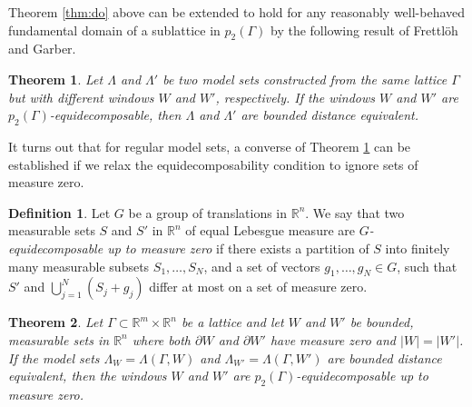 \documentclass[12pt,a4paper,oneside]{amsart}
\theoremstyle{plain}
\newtheorem{theorem}{Theorem}
\theoremstyle{definition}
\newtheorem{definition}{Definition}
\newtheorem{remark}{Remark}
\newcommand{\RR}{{\mathbb R}}
\newcounter{rem}
\begin{document}
Theorem \ref{thm:do} above can be extended to hold for any reasonably well-behaved fundamental domain of a sublattice in $p_2(\Gamma)$ by the following result of Frettl\"{o}h and Garber.
\begin{theorem}{\cite[Theorem 6.1]{FG2018}}\label{thm:fg}
Let $\Lambda$ and $\Lambda'$ be two model sets constructed from the same lattice $\Gamma$ but with different windows $W$ and $W'$, respectively. If the windows $W$ and $W'$ are $p_2(\Gamma)$-equidecomposable, then $\Lambda$ and $\Lambda'$ are bounded distance equivalent. 
\end{theorem}
It turns out that for regular model sets, a converse of Theorem \ref{thm:fg} can be established if we relax the equidecomposability condition to ignore sets of measure zero.
\begin{definition} Let $G$ be a group of translations in $\mathbb{R}^n$. We say that two measurable sets $S$ and $S'$ in $\mathbb{R}^n$ of equal Lebesgue measure are \emph{$G$-equidecomposable up to measure zero} if there exists a partition of $S$ into finitely many measurable subsets $S_1, \ldots , S_N$, and a set of vectors $g_1, \ldots , g_N \in G$, such that $S'$ and $\bigcup_{j=1}^N (S_j+g_j)$ differ at most on a set of measure zero.
\end{definition}
\begin{theorem}{\cite[Theorem 4.1]{EGKL2025}}\label{thm:equidecomp}
Let $\Gamma \subset \mathbb{R}^m \times \mathbb{R}^n$ be a lattice and let $W$ and $W'$ be bounded, measurable sets in $\mathbb{R}^n$ {where both $\partial W$ and $\partial W'$ have measure zero and $|W|=|W'|$}. If the model sets $\Lambda_W = \Lambda(\Gamma, W)$ and $\Lambda_{W'}=\Lambda(\Gamma, W')$ are bounded distance equivalent, then the windows $W$ and $W'$ are $p_2(\Gamma)$-equidecomposable up to measure zero.
\end{theorem}
\end{document}
